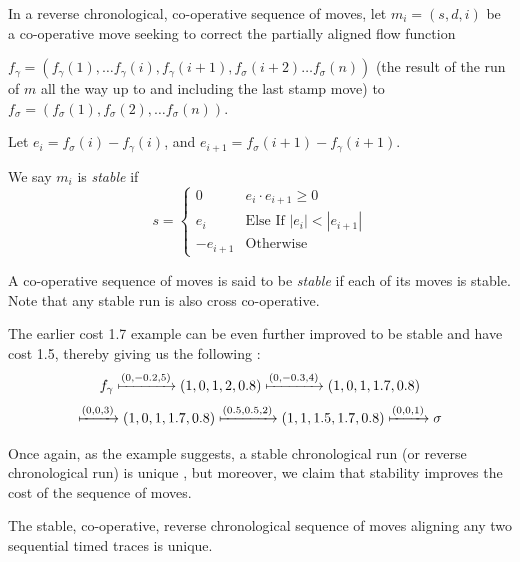 \documentclass[runningheads]{llncs}
\newcounter{cases}
\begin{document}
	\begin{definition}[Stability]
		In a reverse chronological, co-operative sequence of moves, let  ${m_i = (s, d, i)}$ be a co-operative move seeking to correct the partially aligned flow function 
		
		$f_\gamma = (f_\gamma(1), \dots f_\gamma(i), f_\gamma(i+1), f_\sigma(i+2) \dots f_\sigma(n))$ (the result of the run of $m$ all the way up to and including the last stamp move) to $f_\sigma = (f_\sigma(1), f_\sigma(2), \dots f_\sigma(n))$. 
		
		Let $e_i = f_\sigma(i) - f_\gamma(i)$, and $e_{i+1} = f_\sigma(i+1) - f_\gamma(i+1)$. 
		
		We say $m_i$ is \textit{stable} if 
		$$s = \begin{cases}
			0 & e_i\cdot e_{i+1} \geq 0 \\
			e_i & \textrm{Else If }|e_i| < |e_{i+1}| \\
			-e_{i+1} & \textrm{Otherwise}
		\end{cases}$$
	\end{definition}
	
	A co-operative sequence of moves is said to be \textit{stable} if each of its moves is stable.
	Note that any stable run is also cross co-operative. 
	
		\begin{example}
		The earlier cost 1.7 example can be even further improved to be stable and have cost 1.5, thereby giving us the following :
		$$f_\gamma \xmapsto{(0, -0.2, 5)} (1, 0, 1, 2, 0.8) \xmapsto{(0, -0.3, 4)} (1, 0, 1, 1.7, 0.8)$$$$ \xmapsto{(0, 0, 3)} (1, 0, 1, 1.7, 0.8) \xmapsto{(0.5, 0.5, 2)} (1, 1, 1.5, 1.7, 0.8) \xmapsto{(0, 0, 1)} \sigma $$
		
	\end{example}
	
	Once again, as the example suggests, a stable chronological run (or reverse chronological run) is unique , but moreover, we claim that stability improves the cost of the sequence of moves.  
	
	\begin{lemma}\label{stableunique} The stable, co-operative, reverse chronological sequence of moves aligning any two sequential timed traces is unique. 
	\end{lemma}
	
	
\end{document}
